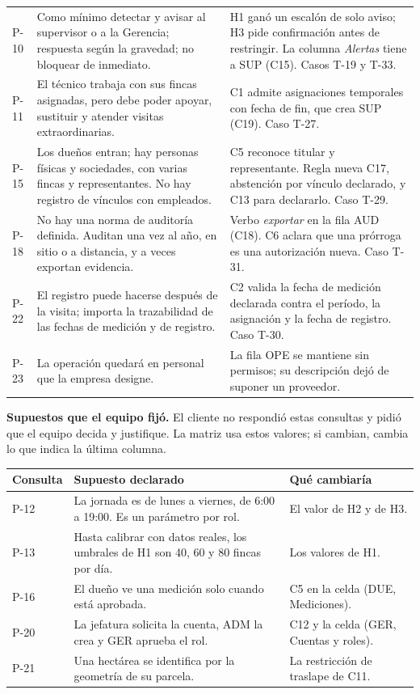\documentclass[11pt,letterpaper]{article}
\newcommand{\cab}[1]{\textbf{\rmfamily #1}}
\begin{document}
{\begin{longtable}{@{}L{1.2cm} L{6.0cm} L{8.4cm}@{}}
P-10 & Como mínimo detectar y avisar al supervisor o a la Gerencia; respuesta según la gravedad; no bloquear de inmediato. & H1 ganó un escalón de solo aviso; H3 pide confirmación antes de restringir. La columna \emph{Alertas} tiene a SUP (C15). Casos T-19 y T-33. \\
P-11 & El técnico trabaja con sus fincas asignadas, pero debe poder apoyar, sustituir y atender visitas extraordinarias. & C1 admite asignaciones temporales con fecha de fin, que crea SUP (C19). Caso T-27. \\
P-15 & Los dueños entran; hay personas físicas y sociedades, con varias fincas y representantes. No hay registro de vínculos con empleados. & C5 reconoce titular y representante. Regla nueva C17, abstención por vínculo declarado, y C13 para declararlo. Caso T-29. \\
P-18 & No hay una norma de auditoría definida. Auditan una vez al año, en sitio o a distancia, y a veces exportan evidencia. & Verbo \emph{exportar} en la fila AUD (C18). C6 aclara que una prórroga es una autorización nueva. Caso T-31. \\
P-22 & El registro puede hacerse después de la visita; importa la trazabilidad de las fechas de medición y de registro. & C2 valida la fecha de medición declarada contra el período, la asignación y la fecha de registro. Caso T-30. \\
P-23 & La operación quedará en personal que la empresa designe. & La fila OPE se mantiene sin permisos; su descripción dejó de suponer un proveedor. \\
\end{longtable}
}

\textbf{Supuestos que el equipo fijó.} El cliente no respondió estas consultas y pidió que el equipo
decida y justifique. La matriz usa estos valores; si cambian, cambia lo que indica la última columna.

\begin{center}
\small
\renewcommand{\arraystretch}{1.22}
\begin{tabularx}{\textwidth}{@{}L{1.2cm} L{6.6cm} Y@{}}
\toprule
\cab{Consulta} & \cab{Supuesto declarado} & \cab{Qué cambiaría} \\
\midrule
P-12 & La jornada es de lunes a viernes, de 6:00 a 19:00. Es un parámetro por rol. & El valor de H2 y de H3. \\
P-13 & Hasta calibrar con datos reales, los umbrales de H1 son 40, 60 y 80 fincas por día. & Los valores de H1. \\
P-16 & El dueño ve una medición solo cuando está aprobada. & C5 en la celda (DUE, Mediciones). \\
P-20 & La jefatura solicita la cuenta, ADM la crea y GER aprueba el rol. & C12 y la celda (GER, Cuentas y roles). \\
P-21 & Una hectárea se identifica por la geometría de su parcela. & La restricción de traslape de C11. \\
\bottomrule
\end{tabularx}
\end{center}
\end{document}
